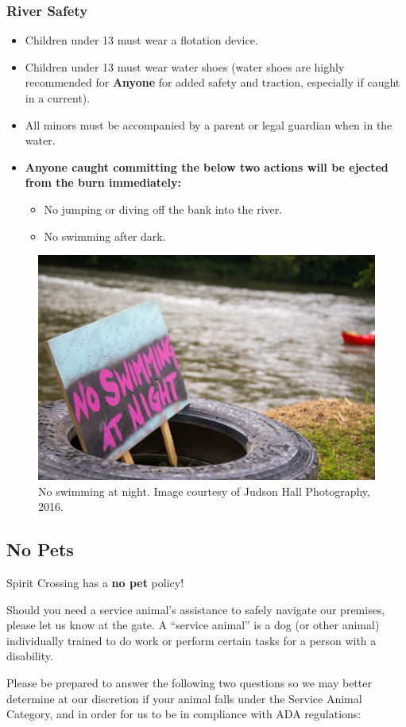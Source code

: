 \subsubsection*{River Safety}
\begin{itemize}[noitemsep]
  \item Children under 13 must wear a flotation device.
  \item Children under 13 must wear water shoes (water shoes are highly recommended for  \textbf{Anyone} for added safety and traction, especially if caught in a current).
  \item All minors must be accompanied by a parent or legal guardian when in the water.
  \item \textbf{Anyone caught committing the below two actions will be ejected from the burn immediately:}
  \begin{itemize}[noitemsep]
    \item No jumping or diving off the bank into the river.
    \item No swimming after dark.
  \end{itemize}
\end{itemize}

\begin{figure}[H]
\centering
\includegraphics[width=.3\textwidth]{images/riversafety.jpeg}
\caption{No swimming at night. Image courtesy of Judson Hall Photography, 2016.}
\label{fig:2016riversafety}
\end{figure}

\clearpage
\subsection*{No Pets}
\label{sub:nopets}

Spirit Crossing has a \textbf{no pet} policy!

Should you need a service animal’s assistance to safely navigate our premises, please let us know at the gate.  A ``service animal'' is a dog (or other animal) individually trained to do work or perform certain tasks for a person with a disability.

Please be prepared to answer the following two questions so we may better determine at our discretion if your animal falls under the Service Animal Category, and in order for us to be in compliance with ADA regulations:

